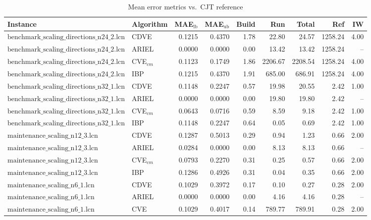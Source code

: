\begin{table}[ht]
\centering
\scriptsize
\caption{Mean error metrics vs.\ CJT reference}
\begin{tabular}{llrrrrrrr}
\toprule
Instance & Algorithm & MAE$_{\text{lb}}$ & MAE$_{\text{ub}}$ & Build & Run & Total & Ref & IW \\
\midrule
$\text{benchmark\_scaling\_directions\_n24\_2.lcn}$ & CDVE & 0.1215 & 0.4370 & 1.78 & 22.80 & 24.57 & 1258.24 & 4.00 \\
$\text{benchmark\_scaling\_directions\_n24\_2.lcn}$ & ARIEL & 0.0000 & 0.0000 & 0.00 & 13.42 & 13.42 & 1258.24 & -- \\
$\text{benchmark\_scaling\_directions\_n24\_2.lcn}$ & CVE$_{cm}$ & 0.1123 & 0.1749 & 1.86 & 2206.67 & 2208.54 & 1258.24 & 4.00 \\
$\text{benchmark\_scaling\_directions\_n24\_2.lcn}$ & IBP & 0.1215 & 0.4370 & 1.91 & 685.00 & 686.91 & 1258.24 & 4.00 \\
\hline
$\text{benchmark\_scaling\_directions\_n32\_1.lcn}$ & CDVE & 0.1148 & 0.2247 & 0.57 & 19.98 & 20.55 & 2.42 & 1.00 \\
$\text{benchmark\_scaling\_directions\_n32\_1.lcn}$ & ARIEL & 0.0000 & 0.0000 & 0.00 & 19.80 & 19.80 & 2.42 & -- \\
$\text{benchmark\_scaling\_directions\_n32\_1.lcn}$ & CVE$_{cm}$ & 0.0643 & 0.0716 & 0.59 & 8.59 & 9.18 & 2.42 & 1.00 \\
$\text{benchmark\_scaling\_directions\_n32\_1.lcn}$ & IBP & 0.1148 & 0.2247 & 0.64 & 0.05 & 0.69 & 2.42 & 1.00 \\
\hline
$\text{maintenance\_scaling\_n12\_3.lcn}$ & CDVE & 0.1287 & 0.5013 & 0.29 & 0.94 & 1.23 & 0.66 & 2.00 \\
$\text{maintenance\_scaling\_n12\_3.lcn}$ & ARIEL & 0.0284 & 0.0000 & 0.00 & 8.13 & 8.13 & 0.66 & -- \\
$\text{maintenance\_scaling\_n12\_3.lcn}$ & CVE$_{cm}$ & 0.0793 & 0.2270 & 0.31 & 0.25 & 0.57 & 0.66 & 2.00 \\
$\text{maintenance\_scaling\_n12\_3.lcn}$ & IBP & 0.1286 & 0.4926 & 0.31 & 0.04 & 0.35 & 0.66 & 2.00 \\
\hline
$\text{maintenance\_scaling\_n6\_1.lcn}$ & CDVE & 0.1029 & 0.3972 & 0.17 & 0.10 & 0.27 & 0.28 & 2.00 \\
$\text{maintenance\_scaling\_n6\_1.lcn}$ & ARIEL & 0.0000 & 0.0000 & 0.00 & 4.16 & 4.16 & 0.28 & -- \\
$\text{maintenance\_scaling\_n6\_1.lcn}$ & CVE & 0.1029 & 0.4017 & 0.14 & 789.77 & 789.91 & 0.28 & 2.00 \\

\end{tabular}
\end{table}
